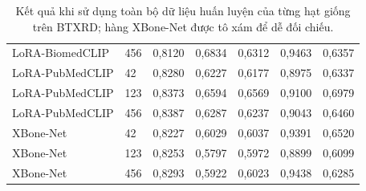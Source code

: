\begin{table}[H]
{\begin{tabular}{L{2.85cm}C{1.05cm}*{5}{C{1.55cm}}}
LoRA-BiomedCLIP & 456 & 0{,}8120 & 0{,}6834 & 0{,}6312 & 0{,}9463 & 0{,}6357 \\
LoRA-PubMedCLIP & 42 & 0{,}8280 & 0{,}6227 & 0{,}6177 & 0{,}8975 & 0{,}6337 \\
LoRA-PubMedCLIP & 123 & 0{,}8373 & 0{,}6594 & 0{,}6569 & 0{,}9100 & 0{,}6979 \\
LoRA-PubMedCLIP & 456 & 0{,}8387 & 0{,}6287 & 0{,}6237 & 0{,}9043 & 0{,}6460 \\
XBone-Net & 42 & 0{,}8227 & 0{,}6029 & 0{,}6037 & 0{,}9391 & 0{,}6520 \\
XBone-Net & 123 & 0{,}8253 & 0{,}5797 & 0{,}5972 & 0{,}8899 & 0{,}6099 \\
XBone-Net & 456 & 0{,}8293 & 0{,}5922 & 0{,}6023 & 0{,}9438 & 0{,}6285 \\
\bottomrule
\end{tabular}%
}
\caption{Kết quả khi sử dụng toàn bộ dữ liệu huấn luyện của từng hạt giống trên BTXRD; hàng XBone-Net được tô xám để dễ đối chiếu.}
\label{tab:appendix-full-shot-seeds-btxrd}
\end{table}

